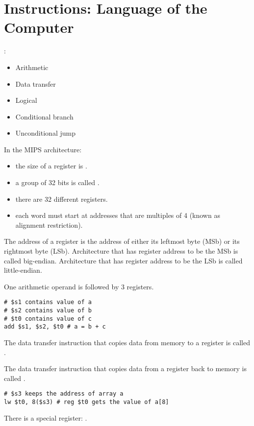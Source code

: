 \chapter{Instructions: Language of the Computer}


  \par {}:
  \begin{itemize}
    \item Arithmetic
    \item Data transfer
    \item Logical
    \item Conditional branch
    \item Unconditional jump
  \end{itemize}

    \par In the MIPS architecture:
    \begin{itemize}
      \item the size of a register is .
      \item a group of 32 bits is called .
      \item there are 32 different registers.
      \item each word must start at addresses that are multiples of 4 (known
        as alignment restriction).
    \end{itemize}
    \par The address of a register is the address of either its leftmost byte
      (MSb) or its rightmost byte (LSb). Architecture that has register address
      to be the MSb is called big-endian. Architecture that has register address
      to be the LSb is called little-endian.
    \par One arithmetic operand is followed by 3 registers.
    \begin{lstlisting}
# $s1 contains value of a
# $s2 contains value of b
# $t0 contains value of c
add $s1, $s2, $t0 # a = b + c
    \end{lstlisting}
    \par The data transfer instruction that copies data from memory to a
      register is called .
    \par The data transfer instruction that copies data from a register back
      to memory is called .
    \begin{lstlisting}
# $s3 keeps the address of array a
lw $t0, 8($s3) # reg $t0 gets the value of a[8]
    \end{lstlisting}
    \par There is a special register: .
